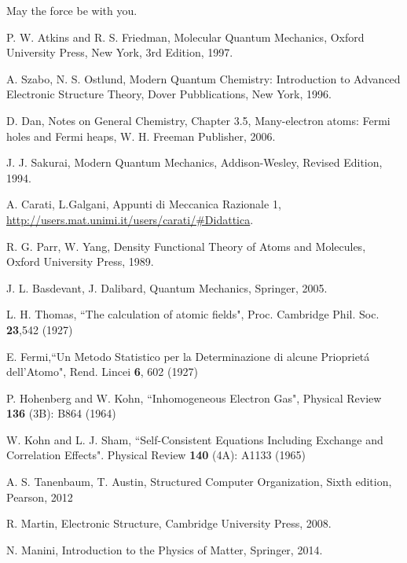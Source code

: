 \documentclass[a4paper,12pt]{article}
\begin{document}
\clearpage
May the force be with you.
\begin{thebibliography}{9}


P. W. Atkins and R. S. Friedman,
Molecular Quantum Mechanics,
Oxford University Press, New York,
3rd Edition,
1997.

A. Szabo, N. S. Ostlund,
Modern Quantum Chemistry: Introduction to Advanced Electronic Structure Theory,
Dover Pubblications, New York,
1996.

D. Dan, Notes on General Chemistry,
Chapter 3.5, Many-electron atoms: Fermi holes and Fermi heaps,
W. H. Freeman Publisher,
2006.

J. J. Sakurai,
Modern Quantum Mechanics,
Addison-Wesley,
Revised Edition,
1994.

A. Carati, L.Galgani,
Appunti di Meccanica Razionale 1,
\url{http://users.mat.unimi.it/users/carati/#Didattica}.

R. G. Parr, W. Yang,
Density Functional Theory of Atoms and Molecules,
Oxford University Press,
1989.

J. L. Basdevant, J. Dalibard,
Quantum Mechanics,
Springer,
2005.


L. H. Thomas, ``The calculation of atomic fields", Proc. Cambridge Phil. Soc. \textbf{23},542 (1927)

E. Fermi,``Un Metodo Statistico per la Determinazione di alcune Priopriet\'a dell'Atomo", Rend. Lincei \textbf{6}, 602 (1927)

P. Hohenberg and W. Kohn, ``Inhomogeneous Electron Gas",  Physical Review \textbf{136} (3B): B864 (1964)

W. Kohn and L. J. Sham, ``Self-Consistent Equations Including Exchange and Correlation Effects". Physical Review \textbf{140} (4A): A1133 (1965)


A. S. Tanenbaum, T. Austin,
Structured Computer Organization,
Sixth edition,
Pearson,
2012


R. Martin, 
Electronic Structure,
Cambridge University Press,
2008.

N. Manini, 
Introduction to the Physics of Matter,
Springer,
2014.



\end{thebibliography}
\end{document}
